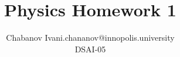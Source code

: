 

\begin{titlepage}
    \title{Physics Homework 1}
    \author{Chabanov Ivan\bigbreak i.chananov@innopolis.university\\DSAI-05}
    \maketitle

\end{titlepage}